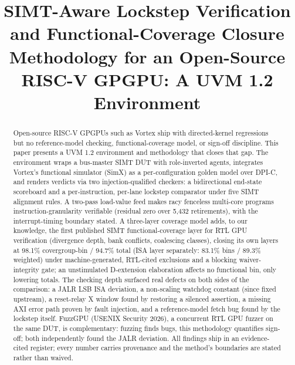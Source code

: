 \documentclass[conference]{IEEEtran}
\begin{document}
\title{SIMT-Aware Lockstep Verification and Functional-Coverage Closure
	Methodology for an Open-Source RISC-V GPGPU: A UVM 1.2 Environment}

\author{
	}

\maketitle

\begin{abstract}
	Open-source RISC-V GPGPUs such as Vortex ship with directed-kernel regressions but no reference-model checking, functional-coverage model, or sign-off discipline. This paper presents a UVM 1.2 environment and methodology that closes that gap. The environment wraps a bus-master SIMT DUT with role-inverted agents, integrates Vortex's functional simulator (SimX) as a per-configuration golden model over DPI-C, and renders verdicts via two injection-qualified checkers: a bidirectional end-state scoreboard and a per-instruction, per-lane lockstep comparator under five SIMT alignment rules. A two-pass load-value feed makes racy fenceless multi-core programs instruction-granularity verifiable (residual zero over 5,432 retirements), with the interrupt-timing boundary stated. A three-layer coverage model adds, to our knowledge, the first published SIMT functional-coverage layer for RTL GPU verification (divergence depth, bank conflicts, coalescing classes), closing its own layers at 98.1\% covergroup-bin / 94.7\% total (ISA layer separately: 83.1\% bins / 89.3\% weighted) under machine-generated, RTL-cited exclusions and a blocking waiver-integrity gate; an unstimulated D-extension elaboration affects no functional bin, only lowering totals. The checking depth surfaced real defects on both sides of the comparison: a JALR LSB ISA deviation, a non-scaling watchdog constant (since fixed upstream), a reset-relay X window found by restoring a silenced assertion, a missing AXI error path proven by fault injection, and a reference-model fetch bug found by the lockstep itself. FuzzGPU (USENIX Security 2026), a concurrent RTL GPU fuzzer on the same DUT, is complementary: fuzzing finds bugs, this methodology quantifies sign-off; both independently found the JALR deviation. All findings ship in an evidence-cited register; every number carries provenance and the method's boundaries are stated rather than waived.
\end{abstract}
\end{document}

